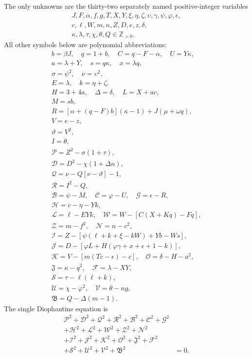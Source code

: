The only unknowns are the thirty-two separately named positive-integer variables
\[
\begin{gathered}J,F,\alpha,f,g,T,X,Y,\xi,\eta,\zeta,\upsilon,\gamma,\psi,\varphi,\epsilon,\\
c,\ell,W,m,n,Z,D,e,z,\delta,\\
\kappa,\lambda,\tau,\chi,\theta,Q\in\mathbb Z_{>0}.\end{gathered}
\]
All other symbols below are polynomial abbreviations:
\[
\begin{gathered}
b=\beta J,\quad q=1+b,\quad C=q-F-\alpha,\quad U=Y\kappa,\\
a=\lambda+Y,\quad s=q\kappa,\quad x=\lambda q,\\
\sigma=\psi^2,\quad\nu=\upsilon^2,\\
E=\lambda,\quad k=\eta+\zeta,\\
H=3+4a,\quad\Delta=\delta,\quad L=X+ac,\\
M=sb,\\
R=[\alpha+(q-F)b](\kappa-1)+J(\mu+\omega q),\\
V=e-z,\\
\vartheta=V^2,\\
I=\theta,\\
\mathcal{P}=Z^2-\sigma(1+\tau),\\
\mathcal{D}=D^2-\chi(1+\Delta n),\\
\mathcal{Q}=\nu-Q[\nu-\vartheta]-1,\\
\mathcal{R}=I^2-Q,\\
\mathcal{B}=\psi-M,\quad \mathcal{C}=\varphi-U,\quad \mathcal{G}=\epsilon-R,\\
\mathcal{H}=c-\eta-Yk,\\
\mathcal{L}=\ell-EYk,\quad \mathcal{W}=W-[C(X+Kq)-Fq],\\
\mathcal{Z}=m-f^2,\quad \mathcal{N}=n-c^2,\\
\mathcal{I}=Z-[\psi(\ell+k+\xi-kW)+Yb-Ws],\\
\mathcal{J}=D-[\varphi L+H(\varphi\gamma+x+\epsilon+1-k)],\\
\mathcal{K}=V-[m(Tc-\epsilon)-c],\quad\mathcal{O}=\delta-H-a^2,\\
\mathfrak{J}=\kappa-q^2,\quad\mathcal{F}=\lambda-XY,\\
\mathcal{S}=\tau-\ell(\ell+k),\\
\mathcal{U}=\chi-\varphi^2,\quad\mathcal{V}=\theta-ng,\\
\mathfrak{B}=Q-\Delta(m-1).
\end{gathered}
\]
The single Diophantine equation is
\[
\begin{split}
\mathcal{P}^2+\mathcal{D}^2+\mathcal{Q}^2+\mathcal{R}^2+\mathcal{B}^2+\mathcal{C}^2+\mathcal{G}^2 &\\
+\mathcal{H}^2+\mathcal{L}^2+\mathcal{W}^2+\mathcal{Z}^2+\mathcal{N}^2 &\\
+\mathcal{I}^2+\mathcal{J}^2+\mathcal{K}^2+\mathcal{O}^2+\mathfrak{J}^2+\mathcal{F}^2 &\\
+\mathcal{S}^2+\mathcal{U}^2+\mathcal{V}^2+\mathfrak{B}^2 &= 0.
\end{split}
\]
